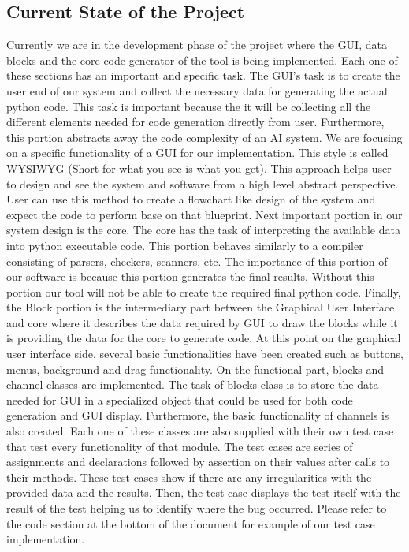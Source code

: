 \documentclass[journal,10pt,onecolumn,compsoc]{IEEEtran} \usepackage[margin=1.0in]{geometry} \usepackage{pdfpages}
\begin{document}
\subsection{Current State of the Project}
Currently we are in the development phase of the project where the GUI, data blocks and the core code generator of the tool is being implemented. Each one of these sections has an important and specific task. The GUI’s task is to create the user end of our system and collect the necessary data for generating the actual python code. This task is important because the it will be collecting all the different elements needed for code generation directly from user. Furthermore, this portion abstracts away the code complexity of an AI system. We are focusing on a specific functionality of a GUI for our implementation. This style is called WYSIWYG (Short for what you see is what you get). This approach helps user to design and see the system and software from a high level abstract perspective. User can use this method to create a flowchart like design of the system and expect the code to perform base on that blueprint. Next important portion in our system design is the core. The core has the task of interpreting the available data into python executable code. This portion behaves similarly to a compiler consisting of parsers, checkers, scanners, etc. The importance of this portion of our software is because this portion generates the final results. Without this portion our tool will not be able to create the required final python code. Finally, the Block  portion is the intermediary part between the Graphical User Interface and core where it describes the data required by GUI to draw the blocks while it is providing the data for the core to generate code. At this point on the graphical user interface side, several basic functionalities have been created such as buttons, menus, background and drag functionality. On the functional part, blocks and channel classes are implemented. The task of blocks class is to store the data needed for GUI in a specialized object that could be used for both code generation and GUI display. Furthermore, the basic functionality of channels is also created. Each one of these classes are also supplied with their own test case that test every functionality of that module. The test cases are series of assignments and declarations followed by assertion on their values after calls to their methods. These test cases show if there are any irregularities with the provided data and the results. Then, the test case displays the test itself with the result of the test helping us to identify where the bug occurred. Please refer to the code section at the bottom of the document for example of our test case implementation.
\end{document}
